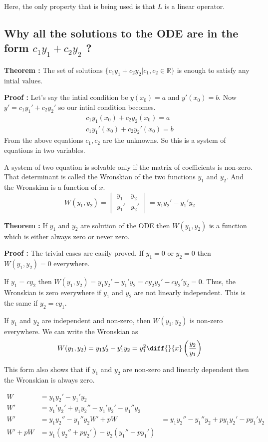 Here, the only property that is being used is that $L$ is a linear operator. 

\subsection{Why all the solutions to the ODE are in the form $c_1 y_1 + c_2 y_2$ ? }

{\bf Theorem : } The set of solutions $\{ c_1 y_1 + c_2 y_2 | c_1, c_2 \in \mathbb{R} \}$ is enough to satisfy any intial values.

{\bf Proof : } Let's say the intial condition be $y(x_0) = a$ and $y'(x_0) = b$.
Now $y' = c_1 y_1' + c_2 y_2'$ so our intial condition becomes.
\begin{gather*}
    c_1 y_1(x_0) + c_2 y_2(x_0) = a \\
    c_1 y_1'(x_0) + c_2 y_2'(x_0) = b 
\end{gather*}
From the above equations $c_1, c_2$ are the unknowns.
So this is a system of equations in two variables.

A system of two equation is solvable only if the matrix of coefficients is non-zero.
That determinant is called the Wronskian of the two functions $y_1$ and $y_2$.
And the Wronskian is a function of $x$.
$$
W(y_1, y_2) = 
\begin{vmatrix*}
    y_1 & y_2 \\
    y_1' & y_2' 
\end{vmatrix*}
    = y_1 y_2' - y_1' y_2
$$

{\bf Theorem : } If $y_1$ and $y_2$ are solution of the ODE then
$W(y_1, y_2)$ is a function which is either always zero or never zero.

{\bf Proof : } The trivial cases are easily proved.
If $y_1 = 0$ or $y_2 = 0$ then $W(y_1, y_2) = 0$ everywhere.

If $y_1 = cy_2$ then $W(y_1, y_2) = y_1 y_2' - y_1' y_2 = c y_2 y_2' - c y_2' y_2 = 0$.
Thus, the Wronskian is zero everywhere if $y_1$ and $y_2$ are not linearly independent.
This is the same if $y_2 = cy_1$.

If $y_1$ and $y_2$ are independent and non-zero, then $W(y_1, y_2)$ is non-zero everywhere.
We can write the Wronskian as 
$$ 
W(y_1, y_2) 
    = y_1 y_2' - y_1' y_2 
    = y_1^2 \diff{}{x} \left( \frac{y_2}{y_1} \right) 
$$

This form also shows that if $y_1$ and $y_2$ are non-zero and linearly dependent then the Wronskian is always zero.

\begin{align*}
    W & = y_1 y_2' - y_1' y_2 \\
    W' & = y_1' y_2' + y_1 y_2'' - y_1' y_2' - y_1'' y_2 \\
    W' & = y_1 y_2'' - y_1'' y_2
    W' + pW & = y_1 y_2'' - y_1'' y_2 + p y_1 y_2' - p y_1' y_2 \\
    W' + pW & = y_1 (y_2'' + p y_2') - y_2( y_1'' + p y_1' )
\end{align*}

